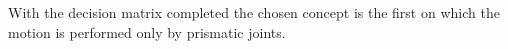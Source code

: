 	With the decision matrix completed the chosen concept is the first on which the motion is performed only by prismatic joints.
	
	

	
	
	
	
	
	
	
	
	
	
	
	
	
	
	
	
	
	
	
	
	
	
	
	
	
	
	
	
	
	
	
	
	
	
	
	
	
	
	
	
	
	
	
	
	
	